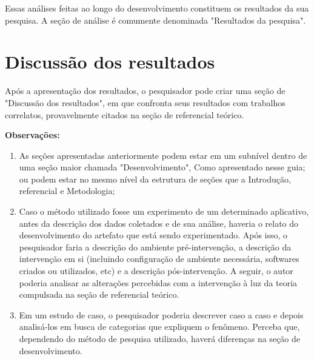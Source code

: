 Essas análises feitas ao longo do desenvolvimento constituem os resultados da sua pesquisa. A seção de análise é comumente denominada "Resultados da pesquisa".

\section{Discussão dos resultados}
Após a apresentação dos resultados, o pesquisador pode criar uma seção de "Discussão dos resultados", em que confronta seus resultados com trabalhos correlatos, provavelmente citados na seção de referencial teórico.

\newpage
\textbf{Observações:} 
\begin{enumerate}
	\item As seções apresentadas anteriormente podem estar em um subnível dentro de uma seção maior chamada "Desenvolvimento", Como apresentado nesse guia; ou podem estar no mesmo nível da estrutura de seções que a Introdução, referencial e Metodologia;
	\item Caso o método utilizado fosse um experimento de um determinado aplicativo, antes da descrição dos dados coletados e de sua análise, haveria o relato do desenvolvimento do artefato que está sendo experimentado. Após isso, o pesquisador faria a descrição do ambiente pré-intervenção, a descrição da intervenção em si (incluindo configuração de ambiente necessária, softwares criados ou utilizados, etc) e a descrição pós-intervenção. A seguir, o autor poderia analisar as alterações percebidas com a intervenção à luz da teoria compulsada na seção de referencial teórico.
	\item Em um estudo de caso, o pesquisador poderia descrever caso a caso e depois analisá-los em busca de categorias que expliquem o fenômeno. Perceba que, dependendo do método de pesquisa utilizado, haverá diferenças na seção de desenvolvimento.
\end{enumerate}




